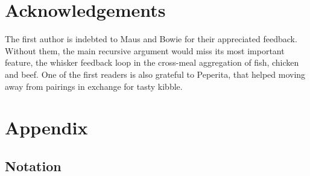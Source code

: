 \documentclass[10pt,article,oneside]{memoir}
\theoremstyle{definition}
\theoremstyle{remark}
\DeclareMathOperator{\open}{\mathsf{Open}}
\begin{document}
\chapter{Acknowledgements}

The first author is indebted to Maus and Bowie for their appreciated feedback.
Without them, the main recursive argument would miss its most important feature, the whisker feedback loop in the cross-meal aggregation of fish, chicken and beef. 
One of the first readers is also grateful to Peperita, that helped moving away from pairings in exchange for tasty kibble.







\appendix
\chapter{Appendix}
\label{s:Appendix}





\section{Notation}
\end{document}

